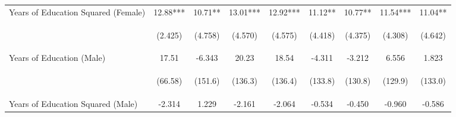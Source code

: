 \begin{landscape}
\begin{table}[htpb!]
\begin{center}
\begin{tabular}{lcccccccc}
Years of Education Squared (Female) &12.88***&10.71**&13.01***&12.92***&11.12**&10.77**&11.54***&11.04**\\
&\begin{footnotesize}(2.425)\end{footnotesize}&\begin{footnotesize}(4.758)\end{footnotesize}&\begin{footnotesize}(4.570)\end{footnotesize}&\begin{footnotesize}(4.575)\end{footnotesize}&\begin{footnotesize}(4.418)\end{footnotesize}&\begin{footnotesize}(4.375)\end{footnotesize}&\begin{footnotesize}(4.308)\end{footnotesize}&\begin{footnotesize}(4.642)\end{footnotesize}\\
Years of Education (Male) &17.51&-6.343&20.23&18.54&-4.311&-3.212&6.556&1.823\\
&\begin{footnotesize}(66.58)\end{footnotesize}&\begin{footnotesize}(151.6)\end{footnotesize}&\begin{footnotesize}(136.3)\end{footnotesize}&\begin{footnotesize}(136.4)\end{footnotesize}&\begin{footnotesize}(133.8)\end{footnotesize}&\begin{footnotesize}(130.8)\end{footnotesize}&\begin{footnotesize}(129.9)\end{footnotesize}&\begin{footnotesize}(133.0)\end{footnotesize}\\
Years of Education Squared (Male) &-2.314&1.229&-2.161&-2.064&-0.534&-0.450&-0.960&-0.586\\

\end{tabular}
\end{center}
\end{table}
\end{landscape}
